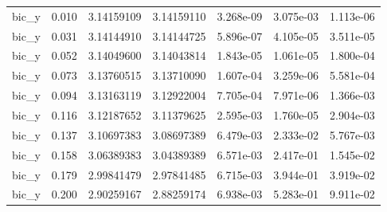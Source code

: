 \begin{tabular}{lrrrrrr}
bic_y & 0.010 & 3.14159109 & 3.14159110 & 3.268e-09 & 3.075e-03 & 1.113e-06 \\
bic_y & 0.031 & 3.14144910 & 3.14144725 & 5.896e-07 & 4.105e-05 & 3.511e-05 \\
bic_y & 0.052 & 3.14049600 & 3.14043814 & 1.843e-05 & 1.061e-05 & 1.800e-04 \\
bic_y & 0.073 & 3.13760515 & 3.13710090 & 1.607e-04 & 3.259e-06 & 5.581e-04 \\
bic_y & 0.094 & 3.13163119 & 3.12922004 & 7.705e-04 & 7.971e-06 & 1.366e-03 \\
bic_y & 0.116 & 3.12187652 & 3.11379625 & 2.595e-03 & 1.760e-05 & 2.904e-03 \\
bic_y & 0.137 & 3.10697383 & 3.08697389 & 6.479e-03 & 2.333e-02 & 5.767e-03 \\
bic_y & 0.158 & 3.06389383 & 3.04389389 & 6.571e-03 & 2.417e-01 & 1.545e-02 \\
bic_y & 0.179 & 2.99841479 & 2.97841485 & 6.715e-03 & 3.944e-01 & 3.919e-02 \\
bic_y & 0.200 & 2.90259167 & 2.88259174 & 6.938e-03 & 5.283e-01 & 9.911e-02 \\
\hline
\end{tabular}